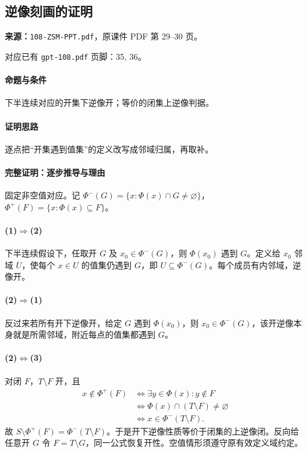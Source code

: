 \clearpage\subsection{逆像刻画的证明}
\textbf{来源：}\texttt{108-ZSM-PPT.pdf}，原课件 PDF 第 29--30 页。\par
对应已有 \texttt{gpt-108.pdf} 页脚：35, 36。\par
\paragraph{命题与条件}下半连续对应的开集下逆像开；等价的闭集上逆像判据。
\paragraph{证明思路}逐点把“开集遇到值集”的定义改写成邻域归属，再取补。
\paragraph{完整证明：逐步推导与理由}

固定非空值对应。记 $\Phi^-(G)=\{x:\Phi(x)\cap G\ne\varnothing\}$，$\Phi^+(F)=\{x:\Phi(x)\subseteq F\}$。
\paragraph{(1)$\Rightarrow$(2)}下半连续假设下，任取开 $G$ 及 $x_0\in\Phi^-(G)$，则 $\Phi(x_0)$ 遇到 $G$。定义给 $x_0$ 邻域 $U$，使每个 $x\in U$ 的值集仍遇到 $G$，即 $U\subseteq\Phi^-(G)$。每个成员有内邻域，逆像开。
\paragraph{(2)$\Rightarrow$(1)}反过来若所有开下逆像开，给定 $G$ 遇到 $\Phi(x_0)$，则 $x_0\in\Phi^-(G)$，该开逆像本身就是所需邻域，附近每点的值集都遇到 $G$。
\paragraph{(2)$\Leftrightarrow$(3)}对闭 $F$，$T\setminus F$ 开，且
\begin{align*}
x\notin\Phi^+(F)&\iff\exists y\in\Phi(x):y\notin F\\
&\iff\Phi(x)\cap(T\setminus F)\ne\varnothing\\
&\iff x\in\Phi^-(T\setminus F).
\end{align*}
故 $S\setminus\Phi^+(F)=\Phi^-(T\setminus F)$。于是开下逆像性质等价于闭集的上逆像闭。反向给任意开 $G$ 令 $F=T\setminus G$，同一公式恢复开性。空值情形须遵守原有效定义域约定。


